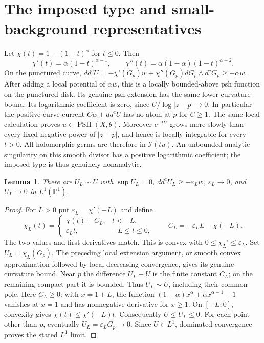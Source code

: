 \documentclass[11pt]{article}
\newtheorem{lemma}{Lemma}
\newcommand{\ddc}{dd^c}
\newcommand{\PSH}{\operatorname{PSH}}
\newcommand{\PP}{\mathbb P}
\begin{document}
\section{The imposed type and small-background representatives}
Let $\chi(t)=1-(1-t)^\alpha$ for $t\leq0$. Then
\[
 \chi'(t)=\alpha(1-t)^{\alpha-1},\qquad
 \chi''(t)=\alpha(1-\alpha)(1-t)^{\alpha-2}.
\]
On the punctured curve,
$\ddc U=-\chi'(G_p)w+\chi''(G_p)dG_p\wedge d^cG_p\geq-\alpha w$.
After adding a local potential of $\alpha w$, this is a locally bounded-above
psh function on the punctured disk. Its genuine psh extension has the same
lower curvature bound. Its logarithmic coefficient is zero, since
$U/\log|z-p|\to0$. In particular the positive curve current
$Cw+\ddc U$ has no atom at $p$ for $C\geq1$.
The same local calculation proves $u\in\PSH(X,\theta)$.
Moreover $e^{-tU}$ grows more slowly than every fixed negative power of
$|z-p|$, and hence is locally integrable for every $t>0$. All holomorphic
germs are therefore in $\mathcal I(tu)$. An unbounded analytic singularity
on this smooth divisor has a positive logarithmic coefficient; the imposed
type is thus genuinely nonanalytic.

\begin{lemma}\label{lem:small}
There are $U_L\sim U$ with $\sup U_L=0$,
$\ddc U_L\geq-\varepsilon_Lw$, $\varepsilon_L\to0$, and
$U_L\to0$ in $L^1(\PP^1)$.
\end{lemma}
\begin{proof}
For $L>0$ put $\varepsilon_L=\chi'(-L)$ and define
\[
 \chi_L(t)=
 \begin{cases}
   \chi(t)+C_L,&t<-L,\\
   \varepsilon_Lt,&-L\leq t\leq0,
 \end{cases}\qquad
 C_L=-\varepsilon_LL-\chi(-L).
\]
The two values and first derivatives match. This is convex with
$0\leq\chi_L'\leq\varepsilon_L$. Set $U_L=\chi_L(G_p)$.
The preceding local extension argument, or smooth convex approximation
followed by local decreasing convergence, gives its genuine curvature bound.
Near $p$ the difference $U_L-U$ is the finite constant $C_L$; on the remaining
compact part it is bounded. Thus $U_L\sim U$, including their common pole.
Here $C_L\geq0$: with $x=1+L$, the function
$(1-\alpha)x^\alpha+\alpha x^{\alpha-1}-1$ vanishes at $x=1$ and has
nonnegative derivative for $x\geq1$. On $[-L,0]$, convexity gives
$\chi(t)\leq\chi'(-L)t$. Consequently $U\leq U_L\leq0$.
For each point other than $p$, eventually $U_L=\varepsilon_LG_p\to0$.
Since $U\in L^1$, dominated convergence proves the stated $L^1$ limit.
\end{proof}
\end{document}
